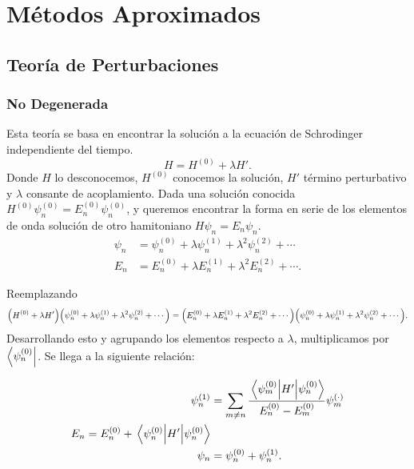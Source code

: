 \chapter{Métodos Aproximados}

\section{Teoría de Perturbaciones}

\subsection{No Degenerada}
Esta teoría se basa en encontrar la solución a la ecuación de Schrodinger independiente del tiempo. 
	\begin{equation}
		H = H^{(0)} + \lambda H'. \label{perturbacion}
	\end{equation}
Donde $H$ lo desconocemos, $H^{(0)}$ conocemos la solución, $H'$ término perturbativo y $\lambda$ consante de acoplamiento. Dada una solución conocida $H^{(0)} \psi _n ^{(0)} = E_n ^{(0)} \psi _n ^{(0)}$, y queremos encontrar la forma en serie de los elementos de onda solución de otro hamitoniano $H \psi _n = E_n \psi _n$.
\begin{align*}
	\psi _n &= \psi _n ^{(0)} + \lambda \psi _n ^{(1)} + \lambda ^2 \psi _n ^{(2)} + \cdots \\
	E_n &= E_n ^{(0)} + \lambda E_n ^{(1)} + \lambda ^2 E_n ^{(2)} + \cdots .
\end{align*}
	
Reemplazando
\begin{equation}
	\qty(H^{(0)} + \lambda H') \qty(\psi _n ^{(0)} + \lambda \psi _n ^{(1)} + \lambda ^2 \psi _n ^{(2)} + \cdots) = \qty(E_n ^{(0)} + \lambda E_n ^{(1)} + \lambda ^2 E_n ^{(2)} + \cdots) \qty(\psi _n ^{(0)} + \lambda \psi _n ^{(1)} + \lambda ^2 \psi _n ^{(2)} + \cdots).
\end{equation}
Desarrollando esto y agrupando los elementos respecto a $\lambda$, multiplicamos por $\bra{\psi _n ^{(0)}}$. Se llega a la siguiente relación:

\begin{align*}
	\psi _n ^{(1)} &= \sum _{m\neq n} \frac{\mel{\psi _m ^{(0)}}{H'}{\psi _n ^{(0)}}}{E_n ^{(0)} - E_m ^{(0)}} \psi _m ^{(\cdot)} \\
	E_n = E_n ^{(0)} + \expval{H'}{\psi _n ^{(0)}} \\
	\psi _n &= \psi _n ^{(0)} + \psi _n ^{(1)}.
\end{align*}
	









